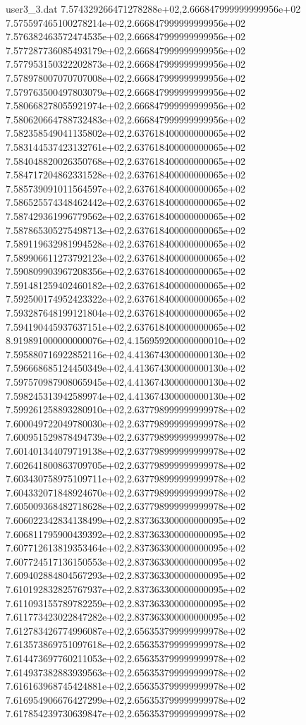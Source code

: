 \begin{filecontents}{user3_3.dat}
7.574329266471278288e+02,2.666847999999999956e+02
7.575597465100278214e+02,2.666847999999999956e+02
7.576382463572474535e+02,2.666847999999999956e+02
7.577287736085493179e+02,2.666847999999999956e+02
7.577953150322202873e+02,2.666847999999999956e+02
7.578978007070707008e+02,2.666847999999999956e+02
7.579763500497803079e+02,2.666847999999999956e+02
7.580668278055921974e+02,2.666847999999999956e+02
7.580620664788732483e+02,2.666847999999999956e+02
7.582358549041135802e+02,2.637618400000000065e+02
7.583144537423132761e+02,2.637618400000000065e+02
7.584048820026350768e+02,2.637618400000000065e+02
7.584717204862331528e+02,2.637618400000000065e+02
7.585739091011564597e+02,2.637618400000000065e+02
7.586525574348462442e+02,2.637618400000000065e+02
7.587429361996779562e+02,2.637618400000000065e+02
7.587865305275498713e+02,2.637618400000000065e+02
7.589119632981994528e+02,2.637618400000000065e+02
7.589906611273792123e+02,2.637618400000000065e+02
7.590809903967208356e+02,2.637618400000000065e+02
7.591481259402460182e+02,2.637618400000000065e+02
7.592500174952423322e+02,2.637618400000000065e+02
7.593287648199121804e+02,2.637618400000000065e+02
7.594190445937637151e+02,2.637618400000000065e+02
8.919891000000000076e+02,4.156959200000000010e+02
7.595880716922852116e+02,4.413674300000000130e+02
7.596668685124450349e+02,4.413674300000000130e+02
7.597570987908065945e+02,4.413674300000000130e+02
7.598245313942589974e+02,4.413674300000000130e+02
7.599261258893280910e+02,2.637798999999999978e+02
7.600049722049780030e+02,2.637798999999999978e+02
7.600951529878494739e+02,2.637798999999999978e+02
7.601401344079719138e+02,2.637798999999999978e+02
7.602641800863709705e+02,2.637798999999999978e+02
7.603430758975109711e+02,2.637798999999999978e+02
7.604332071848924670e+02,2.637798999999999978e+02
7.605009368482718628e+02,2.637798999999999978e+02
7.606022342834138499e+02,2.837363300000000095e+02
7.606811795900439392e+02,2.837363300000000095e+02
7.607712613819353464e+02,2.837363300000000095e+02
7.607724517136150553e+02,2.837363300000000095e+02
7.609402884804567293e+02,2.837363300000000095e+02
7.610192832825767937e+02,2.837363300000000095e+02
7.611093155789782259e+02,2.837363300000000095e+02
7.611773423022847282e+02,2.837363300000000095e+02
7.612783426774996087e+02,2.656353799999999978e+02
7.613573869751097618e+02,2.656353799999999978e+02
7.614473697760211053e+02,2.656353799999999978e+02
7.614937382883939563e+02,2.656353799999999978e+02
7.616163968745424881e+02,2.656353799999999978e+02
7.616954906676427299e+02,2.656353799999999978e+02
7.617854239730639847e+02,2.656353799999999978e+02

\end{filecontents}
